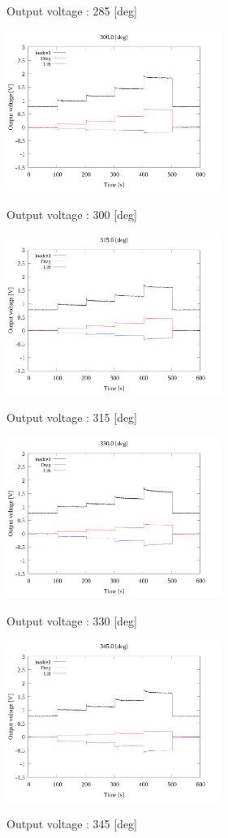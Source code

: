 \begin{multicols}{2}
\begin{figure_here}
\begin{center}
            \caption{Output voltage : 285 [deg]}
            \includegraphics[width=70mm]{../../02_workspace/result/2-1/plot/01-3_allsensors/01_allsensors_3000.png}
            \caption{Output voltage : 300 [deg]}
            \includegraphics[width=70mm]{../../02_workspace/result/2-1/plot/01-3_allsensors/01_allsensors_3150.png}
            \caption{Output voltage : 315 [deg]}
            \includegraphics[width=70mm]{../../02_workspace/result/2-1/plot/01-3_allsensors/01_allsensors_3300.png}
            \caption{Output voltage : 330 [deg]}
            \includegraphics[width=70mm]{../../02_workspace/result/2-1/plot/01-3_allsensors/01_allsensors_3450.png}
            \caption{Output voltage : 345 [deg]}
        \end{center}
    \end{figure_here}
\end{multicols}

